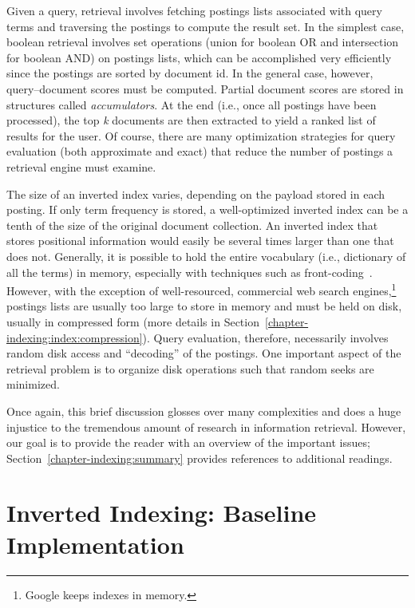 Given a query, retrieval involves fetching postings lists associated
with query terms and traversing the postings to compute the result
set.  In the simplest case, boolean retrieval involves set operations
(union for boolean OR and intersection for boolean AND) on postings
lists, which can be accomplished very efficiently since the postings
are sorted by document id.  In the general case, however,
query--document scores must be computed.  Partial document scores are
stored in structures called \emph{accumulators}.  At the end (i.e.,
once all postings have been processed), the top \emph{k} documents are
then extracted to yield a ranked list of results for the user.  Of
course, there are many optimization strategies for query evaluation
(both approximate and exact) that reduce the number of postings a
retrieval engine must examine.

The size of an inverted index varies, depending on the payload stored
in each posting.  If only term frequency is stored, a well-optimized
inverted index can be a tenth of the size of the original document
collection.  An inverted index that stores positional information
would easily be several times larger than one that does not.
Generally, it is possible to hold the entire vocabulary (i.e.,
dictionary of all the terms) in memory, especially with techniques
such as front-coding~\cite{Witten_etal_1999}.  However, with the
exception of well-resourced, commercial web search
engines,\footnote{Google keeps indexes in memory.}  postings lists are
usually too large to store in memory and must be held on disk, usually
in compressed form (more details in
Section~\ref{chapter-indexing:index:compression}).  Query evaluation,
therefore, necessarily involves random disk access and ``decoding'' of
the postings.  One important aspect of the retrieval problem is to
organize disk operations such that random seeks are minimized.

Once again, this brief discussion glosses over many complexities and
does a huge injustice to the tremendous amount of research in
information retrieval.  However, our goal is to provide the reader
with an overview of the important issues;
Section~\ref{chapter-indexing:summary} provides references to
additional readings.

\section{Inverted Indexing: Baseline Implementation}
\label{chapter-indexing:index:baseline}

